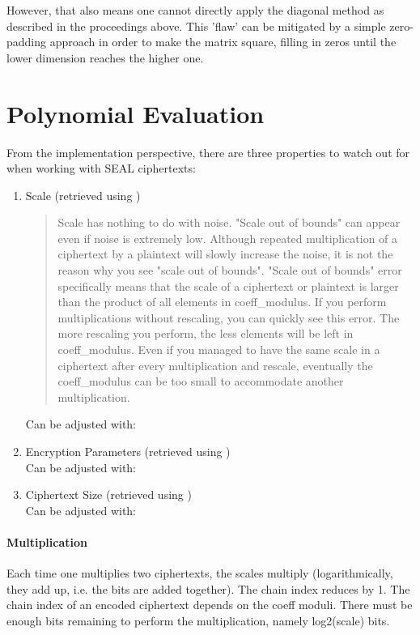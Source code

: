 However, that also means one cannot directly apply the diagonal method
as described in the proceedings above.
This 'flaw' can be mitigated by a simple zero-padding approach
in order to make the matrix square, filling in zeros until
the lower dimension reaches the higher one.

\section{Polynomial Evaluation}
From the implementation perspective, there are three properties to watch out for when
working with SEAL ciphertexts:

\begin{enumerate}
  \item Scale (retrieved using )
        \begin{quote}
          Scale has nothing to do with noise. "Scale out of bounds" can appear even if noise is extremely low. Although repeated multiplication of a ciphertext by a plaintext will slowly increase the noise, it is not the reason why you see "scale out of bounds".
          "Scale out of bounds" error specifically means that the scale of a ciphertext or plaintext is larger than the product of all elements in coeff\_modulus. If you perform multiplications without rescaling, you can quickly see this error. The more rescaling you perform, the less elements will be left in coeff\_modulus. Even if you managed to have the same scale in a ciphertext after every multiplication and rescale, eventually the coeff\_modulus can be too small to accommodate another multiplication.
        \end{quote}

        Can be adjusted with: 
  \item Encryption Parameters (retrieved using ) \\
        Can be adjusted with: 
  \item Ciphertext Size (retrieved using ) \\
        Can be adjusted with: 
\end{enumerate}

\paragraph{Multiplication}
Each time one multiplies two ciphertexts, the scales multiply (logarithmically, they add up, i.e. the bits are added together).
The chain index reduces by 1. The chain index of an encoded ciphertext depends on the coeff moduli.
There must be enough bits remaining to perform the multiplication, namely log2(scale) bits.

